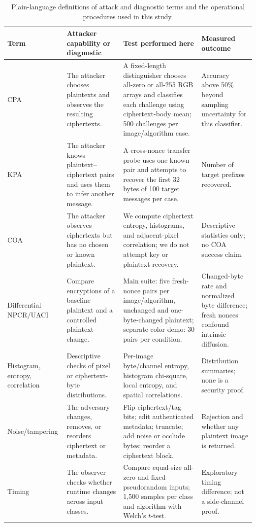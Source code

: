 \documentclass[letterpaper,journal]{IEEEtran}
\begin{document}
\begin{table}[!t]
\caption{Plain-language definitions of attack and diagnostic terms and the operational procedures used in this study.}
\label{tab:attack-definitions}
\centering\small
\setlength{\tabcolsep}{4pt}\renewcommand{\arraystretch}{1.12}
\begin{tabular}{p{}p{}p{}p{}}
\toprule
Term & Attacker capability or diagnostic & Test performed here & Measured outcome \\
\midrule
CPA & The attacker chooses plaintexts and observes the resulting ciphertexts. & A fixed-length distinguisher chooses all-zero or all-255 RGB arrays and classifies each challenge using ciphertext-body mean; 500 challenges per image/algorithm case. & Accuracy above 50\% beyond sampling uncertainty for this classifier. \\
KPA & The attacker knows plaintext--ciphertext pairs and uses them to infer another message. & A cross-nonce transfer probe uses one known pair and attempts to recover the first 32 bytes of 100 target messages per case. & Number of target prefixes recovered. \\
COA & The attacker observes ciphertexts but has no chosen or known plaintext. & We compute ciphertext entropy, histograms, and adjacent-pixel correlation; we do not attempt key or plaintext recovery. & Descriptive statistics only; no COA success claim. \\
Differential NPCR/UACI & Compare encryptions of a baseline plaintext and a controlled plaintext change. & Main suite: five fresh-nonce pairs per image/algorithm, unchanged and one-byte-changed plaintext; separate color demo: 30 pairs per condition. & Changed-byte rate and normalized byte difference; fresh nonces confound intrinsic diffusion. \\
Histogram, entropy, correlation & Descriptive checks of pixel or ciphertext-byte distributions. & Per-image byte/channel entropy, histogram chi-square, local entropy, and spatial correlations. & Distribution summaries; none is a security proof. \\
Noise/tampering & The adversary changes, removes, or reorders ciphertext or metadata. & Flip ciphertext/tag bits; edit authenticated metadata; truncate; add noise or occlude bytes; reorder a ciphertext block. & Rejection and whether any plaintext image is returned. \\
Timing & The observer checks whether runtime changes across input classes. & Compare equal-size all-zero and fixed pseudorandom inputs; 1,500 samples per class and algorithm with Welch's $t$-test. & Exploratory timing difference; not a side-channel proof. \\

\end{tabular}
\end{table}
\end{document}
